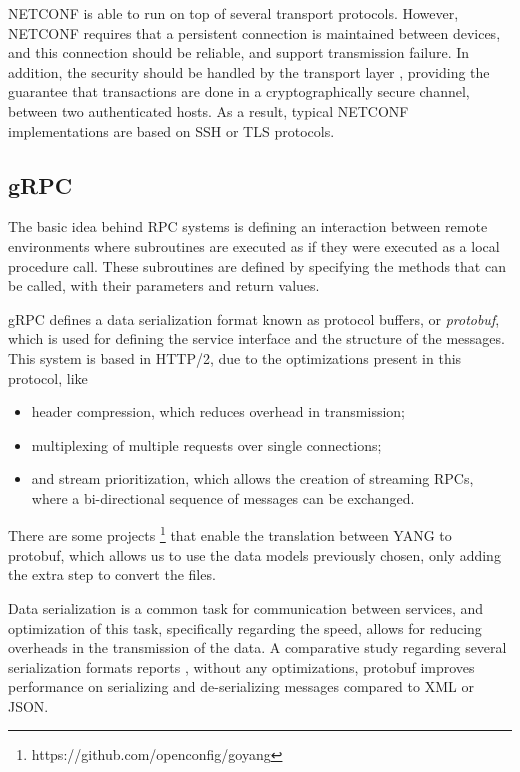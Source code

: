 \par NETCONF is able to run on top of several transport protocols. However, NETCONF requires that a persistent connection is maintained  between devices,
and this connection should be reliable, and support transmission failure. In addition, the security should be handled by the transport layer 
\cite{jurgen_schonwalder_network_2012}, providing the guarantee that transactions are done in a cryptographically secure channel, between two authenticated hosts. 
As a result, typical NETCONF implementations are based on SSH or TLS protocols.

\subsection{gRPC} \label{sec:grpc}

The basic idea behind RPC systems is defining an interaction between remote environments where subroutines are executed as if they were executed as a local
procedure call. These subroutines are defined by specifying the methods that can be called, with their parameters and return values.

\par gRPC defines a data serialization format known as protocol buffers, or \textit {protobuf}, which is used for defining the service interface and the
structure of the messages. This system is based in HTTP/2, due to the optimizations present in this protocol, like

\begin{itemize}
    \item header compression, which reduces overhead in transmission;
    \item multiplexing of multiple requests over single connections;
    \item and stream prioritization, which allows the creation of streaming RPCs, where a bi-directional sequence of messages can be exchanged.
\end{itemize}

\par There are some projects \footnote {https://github.com/openconfig/goyang} that enable the translation between YANG to protobuf, which allows us to use the data
models previously chosen, only adding the extra step to convert the files.

\par Data serialization is a common task for communication between services, and optimization of this task, specifically regarding the speed, allows for reducing
overheads in the transmission of the data. A comparative study regarding several serialization formats reports \cite{maxim_novak_serialization_2014}, without any
optimizations, protobuf improves performance on serializing and de-serializing messages compared to XML or JSON.

